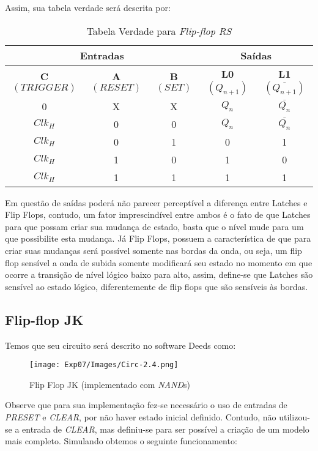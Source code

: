 \documentclass[12pt]{article}
\begin{document}
Assim, sua tabela verdade será descrita por:
\begin{table}[H]
    \centering
    \caption{Tabela Verdade para \emph{Flip-flop RS}}
    \begin{tabular}{|c|c|c||c|c|}\hline
      \multicolumn{3}{|c||}{Entradas} & \multicolumn{2}{|c|}{Saídas} \\\hline
      \textbf{C $({TRIGGER})$} & \textbf{A $({RESET})$} & \textbf{B $({SET})$} & \textbf{L0 $(Q_{n+1})$} & \textbf{L1 $(\overline{Q_{n+1}})$} \\\hline
      0 & X & X & $Q_{n}$ & $\overline{Q_{n}}$ \\\hline
      $Clk_H$ & 0 & 0 & $Q_{n}$ & $\overline{Q_{n}}$\\\hline
      $Clk_H$ & 0 & 1 & 0 & 1\\\hline
      $Clk_H$ & 1 & 0 & 1 & 0 \\\hline
      $Clk_H$ & 1 & 1 & 1 & 1 \\\hline
    \end{tabular}\label{tab:truth_table_flipflop_rs}
\end{table}

Em questão de saídas poderá não parecer perceptível a diferença entre Latches e
Flip Flops, contudo, um fator imprescindível entre ambos é o fato de que Latches
para que possam criar sua mudança de estado, basta que o nível mude para um que
possibilite esta mudança. Já Flip Flops, possuem a característica de que
para criar suas mudanças será possível somente nas bordas da onda, ou seja, um
flip flop sensível a onda de subida somente modificará seu estado no momento em
que ocorre a transição de nível lógico baixo para alto, assim, define-se que
Latches são sensível ao estado lógico, diferentemente de flip flops que são
sensíveis às bordas.

\subsection{Flip-flop JK}\label{sec:2.4}

Temos que seu circuito será descrito no software Deeds como:

\begin{figure}[H]
  \centering
  \texttt{[image: Exp07/Images/Circ-2.4.png]}
  \caption{Flip Flop JK (implementado com \emph{NAND}s)}\label{fig:flip-flop-jk.png}
\end{figure}

Observe que para sua implementação fez-se necessário o uso de entradas de
\emph{PRESET} e \emph{CLEAR}, por não haver estado inicial definido. Contudo,
não utilizou-se a entrada de \emph{CLEAR}, mas definiu-se para ser possível a
criação de um modelo mais completo. Simulando obtemos o seguinte funcionamento: 
\end{document}
